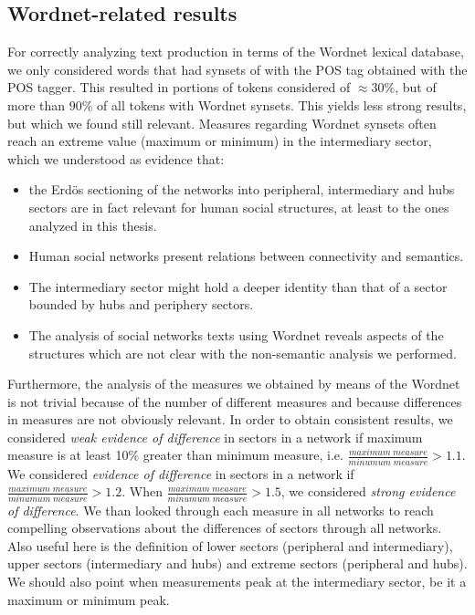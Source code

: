 \subsection{Wordnet-related results}
For correctly analyzing text production in terms of the Wordnet lexical database,
we only considered words that had synsets of with the POS tag obtained with the POS tagger.
This resulted in portions of tokens considered of $\approx 30\%$,
but of more than $90\%$ of all tokens with Wordnet synsets.
This yields less strong results, but which we found still relevant.
Measures regarding Wordnet synsets often reach an extreme value (maximum or minimum)
in the intermediary sector, which we understood as evidence that:
\begin{itemize}
	\item the Erd\"os sectioning of the networks into peripheral, intermediary and hubs sectors are in fact relevant for human social structures, at least to the ones analyzed in this thesis.
	\item Human social networks present relations between connectivity and semantics.
	\item The intermediary sector might hold a deeper identity than that of a sector bounded by hubs and periphery sectors.
	\item The analysis of social networks texts using Wordnet reveals aspects of the structures which are not clear with the non-semantic analysis we performed.
\end{itemize}

Furthermore, the analysis of the measures we obtained by means of the Wordnet
is not trivial because of the number of different measures
and because differences in measures are not obviously relevant.
In order to obtain consistent results, we considered \emph{weak evidence of difference} in sectors in a network
if maximum measure is at least 10\% greater than minimum measure,
i.e. $\frac{maximum\;measure}{minumum\;measure}>1.1$.
We considered \emph{evidence of difference} in sectors in a network if
$\frac{maximum\;measure}{minumum\;measure}>1.2$.
When 
$\frac{maximum\;measure}{minumum\;measure}>1.5$, we considered \emph{strong evidence of difference}.
We than looked through each measure in all networks to reach compelling observations about the
differences of sectors through all networks.
Also useful here is the definition of lower sectors (peripheral and intermediary),
upper sectors (intermediary and hubs) and extreme sectors (peripheral and hubs).
We should also point when measurements peak at the intermediary sector,
be it a maximum or minimum peak.

